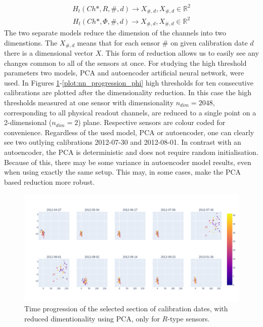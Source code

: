 \begin{align}
  H_{t}(Ch*, R, \#, d) \rightarrow X_{\#,d}, X_{\#,d} \in \mathbb{R}^{2}
  \label{eq:thr_red_R}
\end{align}
\begin{align}
  H_{t}(Ch*, \Phi, \#, d) \rightarrow X_{\#,d}, X_{\#,d} \in \mathbb{R}^{2}
  \label{eq:thr_red_phi}
\end{align}
The two separate models reduce the dimension of the channels into two dimenstions. The $X_{\#,d}$ means that for each sensor $\#$ on given calibration date $d$ there is a dimensional vector $X$.
This form of reduction allows us to easily see any changes common to all of the sensors at once. For studying the high threshold parameters two models, PCA and autoencoder artificial neural network, were used.
In Figures \ref{plot:pca_progression_phi}-\ref{plot:nn_progression_phi} high thresholds for ten consecutive calibrations are plotted after the dimensionality reduction. In this case the high thresholds measured at one sensor with dimensionality $n_{dim}=2048$, corresponding to all physical readout channels, are reduced to a single point on a 2-dimensional ($n_{dim}=2$) plane.
Respective sensors are colour coded for convenience.
Regardless of the used model, PCA or autoencoder, one can clearly see two outlying calibrations 2012-07-30 and 2012-08-01.
In contrast with an autoencoder, the PCA is deterministic and does not require random initialisation. Because of this, there may be some variance in autoencoder model results, even when using exactly the same setup. This may, in some cases, make the PCA based reduction more robust.

\begin{figure}[H]
    \centering
    \includegraphics[width=\linewidth]{figures/chapter4/dimred/PCA_module_R_together.png}
    \caption{Time progression of the selected section of calibration dates, with reduced dimentionality using PCA, only for $R$-type sensors.}
   \label{plot:pca_progression_phi}
  \end{figure}

